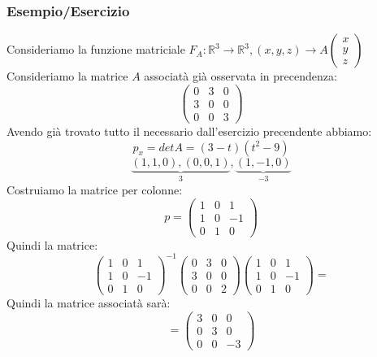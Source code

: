 \subsubsection{Esempio/Esercizio}
Consideriamo la funzione matriciale $F_A: \mathbb{R}^3 \rightarrow \mathbb{R}^3, (x,y,z) \rightarrow A\begin{pmatrix}
x \\ y \\ z
\end{pmatrix}$\\
Consideriamo la matrice $A$ associatà già osservata in precendenza:
$$
\begin{pmatrix}
0 & 3 & 0 \\ 3 & 0 & 0 \\ 0 & 0 & 3
\end{pmatrix}
$$
Avendo già trovato tutto il necessario dall'esercizio precendente abbiamo:
$$ p_x = det A = (3-t)(t^2-9) $$ 
$$ \underbrace{(1,1,0),(0,0,1)}_3,\underbrace{(1,-1,0)}_{-3} $$
Costruiamo la matrice per colonne:
$$ 
p = \begin{pmatrix}
1 & 0 & 1 \\ 1 & 0 & -1 \\ 0 & 1 & 0
\end{pmatrix}
$$
Quindi la matrice:
$$
{\begin{pmatrix}
1 & 0 & 1 \\ 1 & 0 & -1 \\ 0 & 1 & 0
\end{pmatrix}}^{-1}
\begin{pmatrix}
0 & 3 & 0 \\ 3 & 0 & 0 \\ 0 & 0 & 2
\end{pmatrix}
\begin{pmatrix}
1 & 0 & 1 \\ 1 & 0 & -1 \\ 0 & 1 & 0
\end{pmatrix}
= 
$$
Quindi la matrice associatà sarà:
$$
=\begin{pmatrix}
3 & 0 & 0 \\
0 & 3 & 0 \\
0 & 0 & -3
\end{pmatrix}
$$


